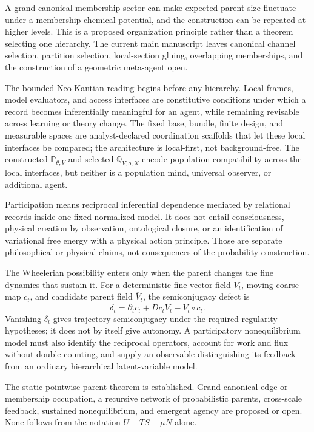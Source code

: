 \documentclass[11pt,letterpaper]{article}
\begin{document}
A grand-canonical membership sector can make expected parent size fluctuate under a membership chemical potential, and the construction can be repeated at higher levels. This is a proposed organization principle rather than a theorem selecting one hierarchy. The current main manuscript leaves canonical channel selection, partition selection, local-section gluing, overlapping memberships, and the construction of a geometric meta-agent open.

The bounded Neo-Kantian reading begins before any hierarchy. Local frames, model evaluators, and access interfaces are constitutive conditions under which a record becomes inferentially meaningful for an agent, while remaining revisable across learning or theory change. The fixed base, bundle, finite design, and measurable spaces are analyst-declared coordination scaffolds that let these local interfaces be compared; the architecture is local-first, not background-free. The constructed \(\mathbb P_{\theta,V}\) and selected \(\mathbb Q_{V,o,X}\) encode population compatibility across the local interfaces, but neither is a population mind, universal observer, or additional agent.

Participation means reciprocal inferential dependence mediated by relational records inside one fixed normalized model. It does not entail consciousness, physical creation by observation, ontological closure, or an identification of variational free energy with a physical action principle. Those are separate philosophical or physical claims, not consequences of the probability construction.


The Wheelerian possibility enters only when the parent changes the fine dynamics that sustain it. For a deterministic fine vector field \(V_t\), moving coarse map \(c_t\), and candidate parent field \(\overline V_t\), the semiconjugacy defect is
\begin{equation}
  \delta_t=\partial_t c_t+Dc_t V_t-\overline V_t\circ c_t.
  \label{eq:participatory-semiconjugacy-defect}
\end{equation}
Vanishing \(\delta_t\) gives trajectory semiconjugacy under the required regularity hypotheses; it does not by itself give autonomy. A participatory nonequilibrium model must also identify the reciprocal operators, account for work and flux without double counting, and supply an observable distinguishing its feedback from an ordinary hierarchical latent-variable model.

\begin{boundarybox}
The static pointwise parent theorem is established. Grand-canonical edge or membership occupation, a recursive network of probabilistic parents, cross-scale feedback, sustained nonequilibrium, and emergent agency are proposed or open. None follows from the notation \(U-TS-\mu N\) alone.
\end{boundarybox}
\end{document}
